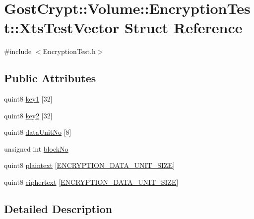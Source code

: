 \hypertarget{struct_gost_crypt_1_1_volume_1_1_encryption_test_1_1_xts_test_vector}{}\section{Gost\+Crypt\+:\+:Volume\+:\+:Encryption\+Test\+:\+:Xts\+Test\+Vector Struct Reference}
\label{struct_gost_crypt_1_1_volume_1_1_encryption_test_1_1_xts_test_vector}


{\ttfamily \#include $<$Encryption\+Test.\+h$>$}

\subsection*{Public Attributes}
\begin{DoxyCompactItemize}
\item 
quint8 \hyperlink{struct_gost_crypt_1_1_volume_1_1_encryption_test_1_1_xts_test_vector_a84b30a91a91892efe36c00f40bd36dca}{key1} \mbox{[}32\mbox{]}
\item 
quint8 \hyperlink{struct_gost_crypt_1_1_volume_1_1_encryption_test_1_1_xts_test_vector_a96f47b8cf45f1e496e8c49534a8405dc}{key2} \mbox{[}32\mbox{]}
\item 
quint8 \hyperlink{struct_gost_crypt_1_1_volume_1_1_encryption_test_1_1_xts_test_vector_a3b0f1dba91c483bffc817a7687734c11}{data\+Unit\+No} \mbox{[}8\mbox{]}
\item 
unsigned int \hyperlink{struct_gost_crypt_1_1_volume_1_1_encryption_test_1_1_xts_test_vector_a807da68aa93b936e6f412279380f6ee5}{block\+No}
\item 
quint8 \hyperlink{struct_gost_crypt_1_1_volume_1_1_encryption_test_1_1_xts_test_vector_af4c474f8c6dccd04030d2f74ac5f8d83}{plaintext} \mbox{[}\hyperlink{_crypto_8h_a7339cf855afd6ec7616a26b99738e2ed}{E\+N\+C\+R\+Y\+P\+T\+I\+O\+N\+\_\+\+D\+A\+T\+A\+\_\+\+U\+N\+I\+T\+\_\+\+S\+I\+ZE}\mbox{]}
\item 
quint8 \hyperlink{struct_gost_crypt_1_1_volume_1_1_encryption_test_1_1_xts_test_vector_af3047f14301f5f8be699f643d03cabd3}{ciphertext} \mbox{[}\hyperlink{_crypto_8h_a7339cf855afd6ec7616a26b99738e2ed}{E\+N\+C\+R\+Y\+P\+T\+I\+O\+N\+\_\+\+D\+A\+T\+A\+\_\+\+U\+N\+I\+T\+\_\+\+S\+I\+ZE}\mbox{]}
\end{DoxyCompactItemize}


\subsection{Detailed Description}


